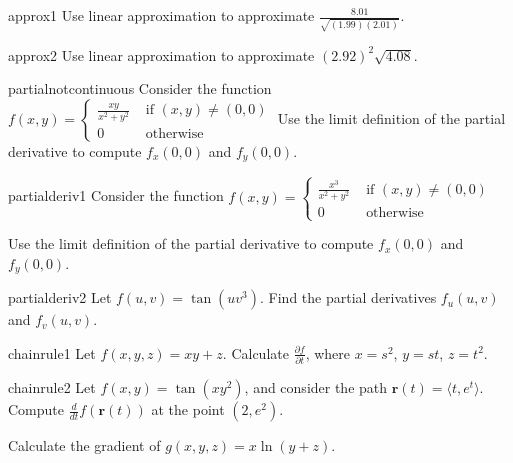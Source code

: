 \begin{problem}{approx1}
    Use linear approximation to approximate $\frac{8.01}{\sqrt{(1.99)(2.01)}}$.
\end{problem}

\begin{problem}{approx2}
    Use linear approximation to approximate $(2.92)^2\sqrt{4.08}$.
\end{problem}

\begin{problem}{partialnotcontinuous}
    Consider the function $f(x,y) = \left\{
		\begin{array}{ll}
			\frac{xy}{x^2 + y^2} & \text{ if } (x,y) \neq (0,0) \\
			0 & \text{ otherwise } 
		\end{array}
		\right.$  Use the limit definition of the partial derivative to compute $f_x(0,0)$ and $f_y(0,0)$.
\end{problem}

\begin{problem}{partialderiv1}
    Consider the function $f(x,y) = \left\{
		\begin{array}{ll}
			\frac{x^3}{x^2 + y^2} & \text{ if } (x,y) \neq (0,0) \\
			0 & \text{ otherwise } 
		\end{array}
		\right.$
		
		Use the limit definition of the partial derivative to compute $f_x(0,0)$ and $f_y(0,0)$.
\end{problem}

\begin{problem}{partialderiv2}
    Let $f(u,v) = \tan(uv^3)$.  Find the partial derivatives $f_u(u,v)$ and $f_v(u,v)$.
\end{problem}


\begin{problem}{chainrule1}
    Let $f(x,y,z) = xy + z$.  Calculate $\frac{\partial f}{\partial t}$, where $x = s^2$, $y = st$, $z = t^2$.
\end{problem}

\begin{problem}{chainrule2}
    Let $f(x,y) = \tan(xy^2)$, and consider the path $\bm{r}(t) = \langle t, e^t \rangle$.  Compute $\frac{d}{dt}f(\bm{r}(t))$ at the point $(2,e^2)$.
\end{problem}

\begin{problem}
    Calculate the gradient of $g(x,y,z) = x\ln(y+z)$.
\end{problem}


